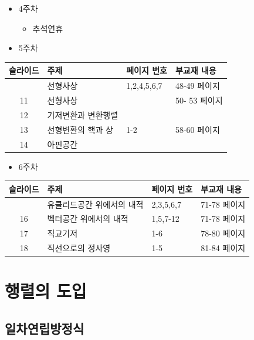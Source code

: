\documentclass[
  11pt,
  a4paper,
  oneside]{scrbook}
\providecommand{\tightlist}{%
  \setlength{\itemsep}{0pt}\setlength{\parskip}{0pt}}\usepackage{longtable,booktabs,array}
\theoremstyle{definition}
\theoremstyle{definition}
\theoremstyle{plain}
\theoremstyle{remark}
\begin{document}
\begin{itemize}
\item
  4주차

  \begin{itemize}
  \tightlist
  \item
    추석연휴
  \end{itemize}
\item
  5주차
\end{itemize}

\begin{longtable}[]{@{}clll@{}}
\toprule\noalign{}
슬라이드 & 주제 & 페이지 번호 & 부교재 내용 \\
\midrule\noalign{}
\endhead
\bottomrule\noalign{}
\endlastfoot
10 & 선형사상 & 1,2,4,5,6,7 & 48-49 페이지 \\
11 & 선형사상 & & 50- 53 페이지 \\
12 & 기저변환과 변환행렬 & & \\
13 & 선형변환의 핵과 상 & 1-2 & 58-60 페이지 \\
14 & 아핀공간 & & \\
\end{longtable}

\begin{itemize}
\tightlist
\item
  6주차
\end{itemize}

\begin{longtable}[]{@{}clll@{}}
\toprule\noalign{}
슬라이드 & 주제 & 페이지 번호 & 부교재 내용 \\
\midrule\noalign{}
\endhead
\bottomrule\noalign{}
\endlastfoot
15 & 유클리드공간 위에서의 내적 & 2,3,5,6,7 & 71-78 페이지 \\
16 & 벡터공간 위에서의 내적 & 1,5,7-12 & 71-78 페이지 \\
17 & 직교기저 & 1-6 & 78-80 페이지 \\
18 & 직선으로의 정사영 & 1-5 & 81-84 페이지 \\
\end{longtable}


\chapter{행렬의 도입}\label{matrix}

\section{일차연립방정식}\label{uxc77cuxcc28uxc5f0uxb9bduxbc29uxc815uxc2dd}
\end{document}
